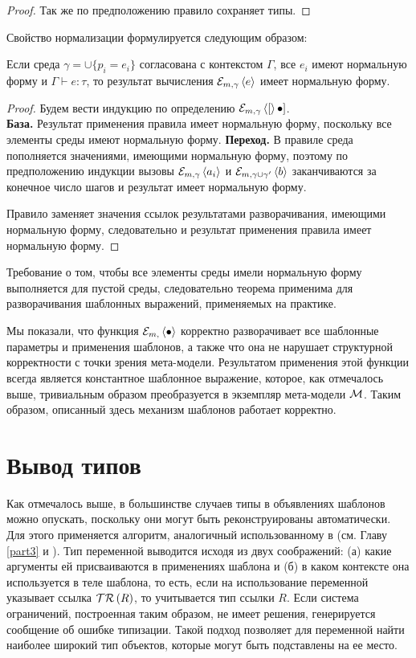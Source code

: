 {\begin{proof}
Так же по предположению правило  сохраняет типы.
\end{proof}

\newcommand{\h}[1]{h\left(#1\right)}
Свойство нормализации формулируется следующим образом:

\begin{Th}[О нормализации]\label{ThNorm}
Если среда $\gamma = \cup \{p_i = e_i\}$ согласована с контекстом $\Gamma$, все $e_i$ имеют нормальную форму и $\Gamma \vdash e : \tau$, то результат вычисления $\mathcal{E}_{m, \gamma} \left\langle e \right\rangle$ имеет нормальную форму.
\end{Th}
\begin{proof} 
Будем вести индукцию по определению $\mathcal{E}_{m, \gamma} \left\langle [ \right\rangle\bullet]$.\\
\textbf{База.} Результат применения правила  имеет нормальную форму, поскольку все элементы среды имеют нормальную форму.
\textbf{Переход.} В правиле  среда пополняется значениями, имеющими нормальную форму, поэтому по предположению индукции вызовы $\mathcal{E}_{m, \gamma} \left\langle a_i \right\rangle$ и $\mathcal{E}_{m, \gamma \cup \gamma'} \left\langle b \right\rangle$ заканчиваются за конечное число шагов и результат имеет нормальную форму.

Правило  заменяет значения ссылок результатами разворачивания, имеющими нормальную форму, следовательно и результат применения правила имеет нормальную форму.
\end{proof}

Требование о том, чтобы все элементы среды имели нормальную форму выполняется для пустой среды, следовательно теорема применима для разворачивания шаблонных выражений, применяемых на практике.

Мы показали, что функция $\mathcal{E}_{m, } \left\langle \bullet \right\rangle$ корректно разворачивает все шаблонные параметры и применения шаблонов, а также что она не нарушает структурной корректности с точки зрения мета-модели. Результатом применения этой функции всегда является константное шаблонное выражение, которое, как отмечалось выше, тривиальным образом преобразуется в экземпляр мета-модели $\mathcal{M}$. Таким образом, описанный здесь механизм шаблонов работает корректно.

\section{Вывод типов}

Как отмечалось выше, в большинстве случаев типы в объявлениях шаблонов можно опускать, поскольку они могут быть реконструированы автоматически. Для этого применяется алгоритм, аналогичный использованному в \ATF{} (см. Главу \ref{part3} и \cite{Pierce}). Тип переменной выводится исходя из двух соображений: (а) какие аргументы ей присваиваются в применениях шаблона и (б) в каком контексте она используется в теле шаблона, то есть, если на использование переменной указывает ссылка $\mathcal{TR}\left(R\right)$, то учитывается тип ссылки $R$. Если система ограничений, построенная таким образом, не имеет решения, генерируется сообщение об ошибке типизации. Такой подход позволяет для переменной найти наиболее широкий тип объектов, которые могут быть подставлены на ее место.

}
